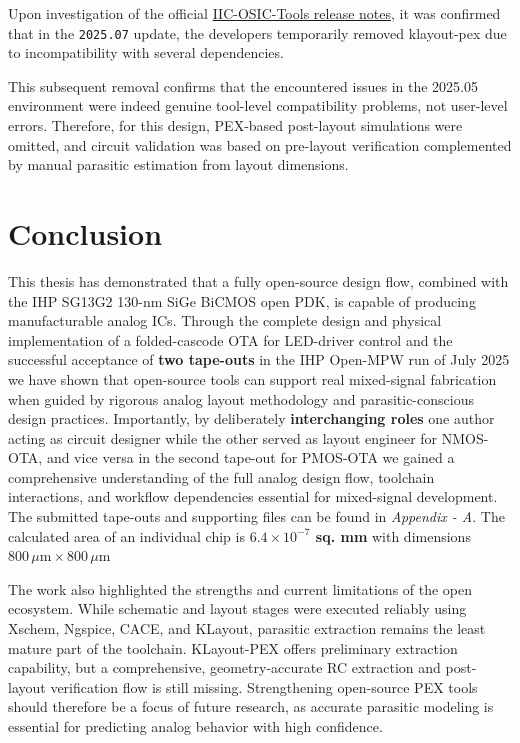 \documentclass[
  11pt,
  a4paper,
  oneside]{scrbook}
\begin{document}
Upon investigation of the official \href{}{IIC-OSIC-Tools release
notes}, it was confirmed that in the \texttt{2025.07} update, the
developers temporarily removed klayout-pex due to incompatibility with
several dependencies.

This subsequent removal confirms that the encountered issues in the
2025.05 environment were indeed genuine tool-level compatibility
problems, not user-level errors. Therefore, for this design, PEX-based
post-layout simulations were omitted, and circuit validation was based
on pre-layout verification complemented by manual parasitic estimation
from layout dimensions.


\chapter{Conclusion}\label{conclusion}

This thesis has demonstrated that a fully open-source design flow,
combined with the IHP SG13G2 130-nm SiGe BiCMOS open PDK, is capable of
producing manufacturable analog ICs. Through the complete design and
physical implementation of a folded-cascode OTA for LED-driver control
and the successful acceptance of \textbf{two tape-outs} in the IHP
Open-MPW run of July 2025 we have shown that open-source tools can
support real mixed-signal fabrication when guided by rigorous analog
layout methodology and parasitic-conscious design practices.
Importantly, by deliberately \textbf{interchanging roles} one author
acting as circuit designer while the other served as layout engineer for
NMOS-OTA, and vice versa in the second tape-out for PMOS-OTA we gained a
comprehensive understanding of the full analog design flow, toolchain
interactions, and workflow dependencies essential for mixed-signal
development. The submitted tape-outs and supporting files can be found
in \emph{Appendix - A}. The calculated area of an individual chip is
\textbf{\(6.4 \times 10^{-7}\) sq. mm} with dimensions
\textbf{\(800\,\mu\text{m} \times 800\,\mu\text{m}\)}

The work also highlighted the strengths and current limitations of the
open ecosystem. While schematic and layout stages were executed reliably
using Xschem, Ngspice, CACE, and KLayout, parasitic extraction remains
the least mature part of the toolchain. KLayout-PEX offers preliminary
extraction capability, but a comprehensive, geometry-accurate RC
extraction and post-layout verification flow is still missing.
Strengthening open-source PEX tools should therefore be a focus of
future research, as accurate parasitic modeling is essential for
predicting analog behavior with high confidence.
\end{document}
